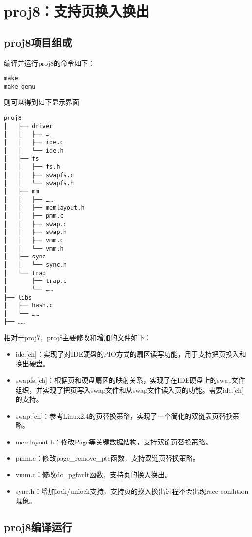\section{proj8：支持页换入换出}\label{proj8ux652fux6301ux9875ux6362ux5165ux6362ux51fa}

\subsection{proj8项目组成}\label{proj8ux9879ux76eeux7ec4ux6210}

编译并运行proj8的命令如下：

\begin{lstlisting}
make
make qemu
\end{lstlisting}

则可以得到如下显示界面

\begin{lstlisting}
proj8
│   ├── driver
│   │   ├── …
│   │   ├── ide.c
│   │   └── ide.h
│   ├── fs
│   │   ├── fs.h
│   │   ├── swapfs.c
│   │   └── swapfs.h
│   ├── mm
│   │   ├── ……
│   │   ├── memlayout.h
│   │   ├── pmm.c
│   │   ├── swap.c
│   │   ├── swap.h
│   │   ├── vmm.c
│   │   └── vmm.h
│   ├── sync
│   │   └── sync.h
│   └── trap
│       ├── trap.c
│       └── ……
├── libs
│   ├── hash.c
│   └── ……
├── ……
\end{lstlisting}

相对于proj7，proj8主要修改和增加的文件如下：

\begin{itemize}
\tightlist
\item
  ide.{[}ch{]}：实现了对IDE硬盘的PIO方式的扇区读写功能，用于支持把页换入和换出硬盘。
\item
  swapfs.{[}ch{]}：根据页和硬盘扇区的映射关系，实现了在IDE硬盘上的swap文件组织，并实现了把页写入swap文件和从swap文件读入页的功能。需要ide.{[}ch{]}的支持。
\item
  swap.{[}ch{]}：参考Linux2.4的页替换策略，实现了一个简化的双链表页替换策略。
\item
  memlayout.h：修改Page等关键数据结构，支持双链页替换策略。
\item
  pmm.c：修改page\_remove\_pte函数，支持双链页替换策略。
\item
  vmm.c：修改do\_pgfault函数，支持页的换入换出。
\item
  sync.h：增加lock/unlock支持，支持页的换入换出过程不会出现race
  condition现象。
\end{itemize}

\subsection{proj8编译运行}\label{proj8ux7f16ux8bd1ux8fd0ux884c}

